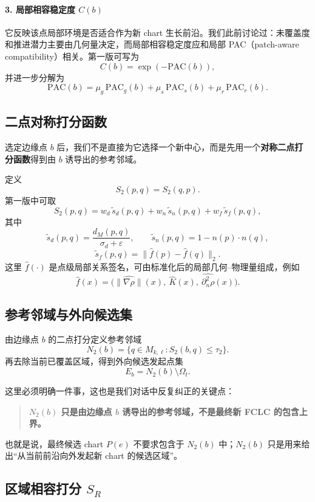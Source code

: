 \documentclass[12pt,a4paper]{ctexart}
\begin{document}
\paragraph{3. 局部相容稳定度 \(C(b)\)}
它反映该点局部环境是否适合作为新 chart 生长前沿。我们此前讨论过：未覆盖度和推进潜力主要由几何量决定，而局部相容稳定度应和局部 PAC（patch-aware compatibility）相关。第一版可写为
\[
C(b)=\exp(-\mathrm{PAC}(b)),
\]
并进一步分解为
\[
\mathrm{PAC}(b)
=
\mu_g\,\mathrm{PAC}_g(b)
+
\mu_s\,\mathrm{PAC}_s(b)
+
\mu_r\,\mathrm{PAC}_r(b).
\]

\subsection{二点对称打分函数}

选定边缘点 \(b\) 后，我们不是直接为它选择一个新中心，而是先用一个\textbf{对称二点打分函数}得到由 \(b\) 诱导出的参考邻域。

定义
\[
S_2(p,q)=S_2(q,p).
\]
第一版中可取
\[
S_2(p,q)
=
w_d\,\tilde s_d(p,q)
+
w_n\,\tilde s_n(p,q)
+
w_f\,\tilde s_f(p,q),
\]
其中
\[
\tilde s_d(p,q)=\frac{d_M(p,q)}{\sigma_d+\varepsilon},
\qquad
\tilde s_n(p,q)=1-n(p)\cdot n(q),
\]
\[
\tilde s_f(p,q)=\|\hat f(p)-\hat f(q)\|_2.
\]
这里 \(\hat f(\cdot)\) 是点级局部关系签名，可由标准化后的局部几何--物理量组成，例如
\[
\hat f(x)
=
\Big(
\widehat{\|\nabla\rho\|}(x),\
\hat K(x),\
\widehat{\partial_n^2\rho}(x)
\Big).
\]

\subsection{参考邻域与外向候选集}

由边缘点 \(b\) 的二点打分定义参考邻域
\[
N_2(b)=\{q\in M_{k,\ell}:S_2(b,q)\le \tau_2\}.
\]
再去除当前已覆盖区域，得到外向候选发起点集
\[
E_b=N_2(b)\setminus\Omega_t.
\]

这里必须明确一件事，这也是我们对话中反复纠正的关键点：

\begin{quote}
\textbf{\(N_2(b)\) 只是由边缘点 \(b\) 诱导出的参考邻域，不是最终新 FCLC 的包含上界。}
\end{quote}

也就是说，最终候选 chart \(P(e)\) 不要求包含于 \(N_2(b)\) 中；\(N_2(b)\) 只是用来给出“从当前前沿向外发起新 chart 的候选区域”。

\subsection{区域相容打分 \(S_R\)}
\end{document}
